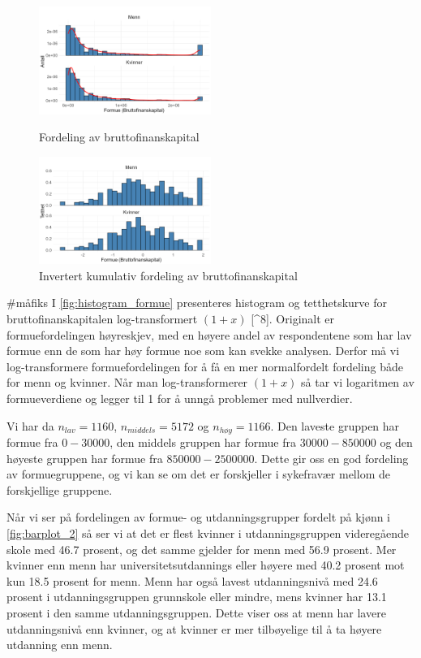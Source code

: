 \documentclass[
  12pt,
  a4paper,
  DIV=11,
  numbers=noendperiod]{scrartcl}
\begin{document}
\begin{figure} 
    \centering
    \includegraphics[width=0.5\textwidth]{dokumentobjekter/figurer/fig_4_1.png}
    \caption{Fordeling av bruttofinanskapital}
    \label{fig:histogram_formue}
    \smallskip\par
    \includegraphics[width=0.5\textwidth]{dokumentobjekter/figurer/fig_4_2.png}
    \caption{Invertert kumulativ fordeling av bruttofinanskapital}
    \label{fig:histogram_formue_fordeling}
\end{figure}

\#måfiks I \autoref{fig:histogram_formue} presenteres histogram og
tetthetskurve for bruttofinanskapitalen log-transformert \((1 + x)\)
{[}\^{}8{]}. Originalt er formuefordelingen høyreskjev, med en høyere
andel av respondentene som har lav formue enn de som har høy formue noe
som kan svekke analysen. Derfor må vi log-transformere formuefordelingen
for å få en mer normalfordelt fordeling både for menn og kvinner. Når
man log-transformerer \((1 + x)\) så tar vi logaritmen av formueverdiene
og legger til 1 for å unngå problemer med nullverdier.

Vi har da \(n_{lav} = 1160\), \(n_{middels} = 5172\) og
\(n_{høy} = 1166\). Den laveste gruppen har formue fra \(0 - 30000\),
den middels gruppen har formue fra \(30000 - 850000\) og den høyeste
gruppen har formue fra \(850000 - 2500000\). Dette gir oss en god
fordeling av formuegruppene, og vi kan se om det er forskjeller i
sykefravær mellom de forskjellige gruppene.

\newpage

Når vi ser på fordelingen av formue- og utdanningsgrupper fordelt på
kjønn i \autoref{fig:barplot_2} så ser vi at det er flest kvinner i
utdanningsgruppen videregående skole med 46.7 prosent, og det samme
gjelder for menn med 56.9 prosent. Mer kvinner enn menn har
universitetsutdannings eller høyere med 40.2 prosent mot kun 18.5
prosent for menn. Menn har også lavest utdanningsnivå med 24.6 prosent i
utdanningsgruppen grunnskole eller mindre, mens kvinner har 13.1 prosent
i den samme utdanningsgruppen. Dette viser oss at menn har lavere
utdanningsnivå enn kvinner, og at kvinner er mer tilbøyelige til å ta
høyere utdanning enn menn.
\end{document}
